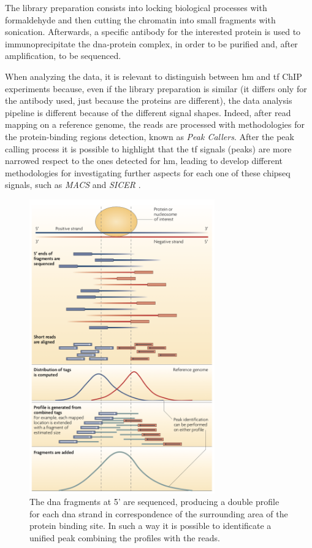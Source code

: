 The library preparation consists into locking biological processes with formaldehyde and then cutting the chromatin into small fragments with sonication.
Afterwards, a specific antibody for the interested protein is used to immunoprecipitate the \gls{dna}-protein complex, in order to be purified and, after amplification, to be sequenced.

When analyzing the data, it is relevant to distinguish between \gls{hm} and \gls{tf} ChIP experiments because, even if the library preparation is similar (it differs only for the antibody used, just because the proteins are different), the data analysis pipeline is different because of the different signal shapes.
Indeed, after read mapping on a reference genome, the reads are
processed with methodologies for the protein-binding regions detection, known as \textit{Peak Callers}.
After the peak calling process it is possible to highlight that the \gls{tf} signals (peaks) are more narrowed respect to the ones detected for \gls{hm}, leading to develop different methodologies for investigating further aspects for each one of these \gls{chipseq} signals, such as \textit{MACS} \cite{Zhang2008} and \textit{SICER} \cite{Zang2009}.

\begin{figure}[H]
\centering
\includegraphics[width=8cm, keepaspectratio]{img/intro/peak_call.png}
\caption[\gls{chipseq} peak detection]{The \gls{dna} fragments at 5' are sequenced, producing a double profile for each \gls{dna} strand in correspondence of the surrounding area of the protein binding site.
In such a way it is possible to identificate a unified peak combining the profiles with the reads.\cite{Park2009}}
\label{fig:chipseqexp}
\end{figure}

